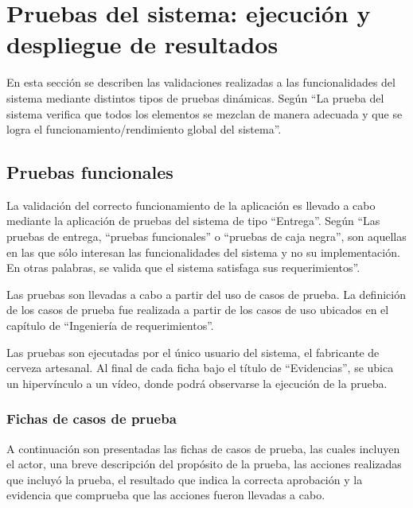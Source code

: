 \section{Pruebas del sistema: ejecución y despliegue de resultados}

\par En esta sección se describen las validaciones realizadas a las funcionalidades del sistema mediante distintos tipos de pruebas dinámicas. Según \cite{Press10} ``La prueba del sistema verifica que todos los elementos se mezclan de manera adecuada y que se logra el funcionamiento/rendimiento global del sistema''.

\subsection{Pruebas funcionales}

\par La validación del correcto funcionamiento de la aplicación es llevado a cabo mediante la aplicación de pruebas del sistema de tipo ``Entrega''. Según \cite{Som05} ``Las pruebas de entrega, “pruebas funcionales” o “pruebas de caja negra”, son aquellas en las que sólo interesan las funcionalidades del sistema y no su implementación. En otras palabras, se valida que el sistema satisfaga sus requerimientos''.
\par Las pruebas son llevadas a cabo a partir del uso de casos de prueba. La definición de los casos de prueba fue realizada a partir de los casos de uso ubicados en el capítulo de ``Ingeniería de requerimientos''.
\par Las pruebas son ejecutadas por el único usuario del sistema, el fabricante de cerveza artesanal. Al final de cada ficha bajo el título de ``Evidencias'', se ubica un hipervínculo a un vídeo, donde podrá observarse la ejecución de la prueba.

\subsubsection{Fichas de casos de prueba}

\par A continuación son presentadas las fichas de casos de prueba, las cuales incluyen el actor, una breve descripción del propósito de la prueba, las acciones realizadas que incluyó la prueba, el resultado que indica la correcta aprobación y la evidencia que comprueba que las acciones fueron llevadas a cabo.


